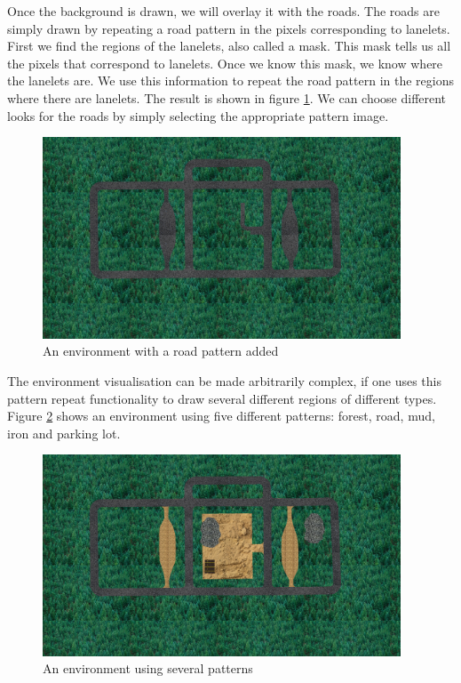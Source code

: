 Once the background is drawn, we will overlay it with the roads. The roads are simply drawn by repeating a road pattern in the pixels corresponding to lanelets. First we find the regions of the lanelets, also called a mask. This mask tells us all the pixels that correspond to lanelets. Once we know this mask, we know where the lanelets are. We use this information to repeat the road pattern in the regions where there are lanelets. The result is shown in figure \ref{fig:visualisation_background_and_roads}. We can choose different looks for the roads by simply selecting the appropriate pattern image. 

\begin{figure}[h!]
  \centering
    \includegraphics[width=0.95\textwidth]{visualisation_background_and_roads}
    \caption{An environment with a road pattern added \label{fig:visualisation_background_and_roads} }
\end{figure}

The environment visualisation can be made arbitrarily complex, if one uses this pattern repeat functionality to draw several different regions of different types. Figure \ref{fig:visualisation_background_with_several_patterns} shows an environment using five different patterns: forest, road, mud, iron and parking lot.

\begin{figure}[h!]
  \centering
    \includegraphics[width=0.95\textwidth]{visualisation_background_with_several_patterns}
    \caption{An environment using several patterns \label{fig:visualisation_background_with_several_patterns} }
\end{figure}

